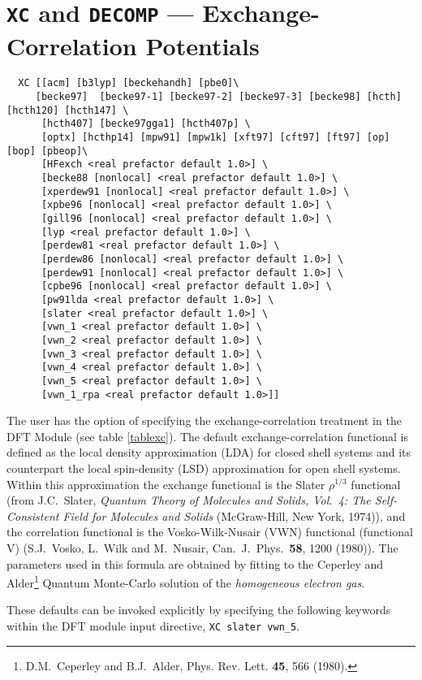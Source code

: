 \section{{\tt XC} and {\tt DECOMP} --- Exchange-Correlation Potentials}
\label{sec:xc}
\begin{verbatim}
  XC [[acm] [b3lyp] [beckehandh] [pbe0]\
     [becke97]  [becke97-1] [becke97-2] [becke97-3] [becke98] [hcth] [hcth120] [hcth147] \
      [hcth407] [becke97gga1] [hcth407p] \
      [optx] [hcthp14] [mpw91] [mpw1k] [xft97] [cft97] [ft97] [op] [bop] [pbeop]\
      [HFexch <real prefactor default 1.0>] \
      [becke88 [nonlocal] <real prefactor default 1.0>] \
      [xperdew91 [nonlocal] <real prefactor default 1.0>] \
      [xpbe96 [nonlocal] <real prefactor default 1.0>] \
      [gill96 [nonlocal] <real prefactor default 1.0>] \
      [lyp <real prefactor default 1.0>] \
      [perdew81 <real prefactor default 1.0>] \
      [perdew86 [nonlocal] <real prefactor default 1.0>] \
      [perdew91 [nonlocal] <real prefactor default 1.0>] \
      [cpbe96 [nonlocal] <real prefactor default 1.0>] \
      [pw91lda <real prefactor default 1.0>] \
      [slater <real prefactor default 1.0>] \
      [vwn_1 <real prefactor default 1.0>] \
      [vwn_2 <real prefactor default 1.0>] \
      [vwn_3 <real prefactor default 1.0>] \
      [vwn_4 <real prefactor default 1.0>] \
      [vwn_5 <real prefactor default 1.0>] \
      [vwn_1_rpa <real prefactor default 1.0>]]
\end{verbatim}

The user has the option of specifying the exchange-correlation
treatment in the DFT Module (see table \ref{tablexc}).
  The default exchange-correlation
functional is defined as the local density approximation (LDA) for
closed shell systems and its counterpart the local spin-density (LSD)
approximation for open shell systems.  Within this approximation the
exchange functional is the Slater $\rho^{1/3}$ functional (from
J.C.~Slater, {\sl Quantum Theory of Molecules and Solids, Vol.~4: The
  Self-Consistent Field for Molecules and Solids} (McGraw-Hill, New
York, 1974)), and the correlation functional is the Vosko-Wilk-Nusair
(VWN) functional (functional V) (S.J.~Vosko, L.~Wilk and M.~Nusair,
Can.~J.~Phys.~{\bf 58}, 1200 (1980)).  The parameters used in this
formula are obtained by fitting to the Ceperley and
Alder\footnote{D.M.~Ceperley and B.J.~Alder, Phys. Rev. Lett. {\bf
    45}, 566 (1980).}
Quantum Monte-Carlo solution of the {\em
  homogeneous electron gas}.

These defaults can be invoked explicitly by specifying the following
keywords within the DFT module input directive, \verb+XC slater vwn_5+.


